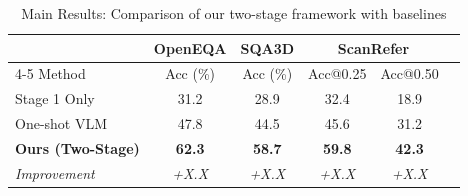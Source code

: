 \begin{table}[t]
\centering
\small
\renewcommand{\arraystretch}{1.2}
\begin{tabular}{l ccc cc}
\toprule
 & OpenEQA & SQA3D & \multicolumn{2}{c}{ScanRefer} \\
\cmidrule(lr){4-5}
Method & Acc (\%) & Acc (\%) & Acc@0.25 & Acc@0.50 \\
\midrule
Stage 1 Only & 31.2 & 28.9 & 32.4 & 18.9 \\
One-shot VLM & 47.8 & 44.5 & 45.6 & 31.2 \\
\textbf{Ours (Two-Stage)} & \textbf{62.3} & \textbf{58.7} & \textbf{59.8} & \textbf{42.3} \\
\midrule
\textit{Improvement} & \textit{+X.X} & \textit{+X.X} & \textit{+X.X} & \textit{+X.X} \\
\bottomrule
\end{tabular}
\caption{Main Results: Comparison of our two-stage framework with baselines}
\label{tab:main-results}
\end{table}